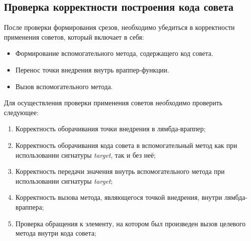 \subsection{Проверка корректности построения кода совета}
\label{subs:advice_code_testing_program}
После проверки формирования срезов, необходимо убедиться в корректности применения советов, который включает в себя:
\begin{itemize}
	\item Формирование вспомогательного метода, содержащего код совета.
	\item Перенос точки внедрения внутрь враппер-функции.
	\item Вызов вспомогательного метода.
\end{itemize}
Для осуществления проверки применения советов необходимо проверить следующее:
\begin{enumerate}
    \item \label{list:lambda_wrapper_check}Корректность оборачивания точки внедрения в лямбда-враппер;
    \item \label{list:buffer_method_check}Корректность оборачивания кода совета в вспомогательный метод как при использовании сигнатуры \textit{target}, так и без неё;
    \item \label{list:buffer_method_call_check}Корректность передачи значения внутрь вспомогательного метода при использовании сигнатуры \textit{target};
    \item \label{list:pointcut_call_check}Корректность вызова метода, являющегося точкой внедрения, внутри лямбда-враппера;
    \item \label{list:target_use_check}Проверка обращения к элементу, на котором был произведен вызов целевого метода внутри кода совета;
\end{enumerate}
